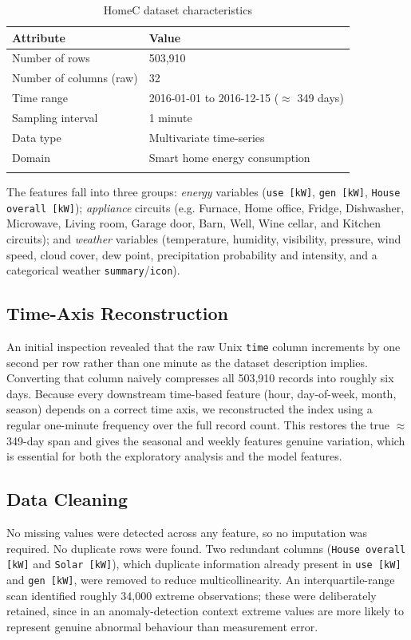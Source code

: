 \documentclass[pdflatex,sn-mathphys-num]{sn-jnl}%
\theoremstyle{thmstyleone}%
\theoremstyle{thmstyletwo}%
\theoremstyle{thmstylethree}%
\begin{document}
\begin{table}[h]
\caption{HomeC dataset characteristics}\label{tab:dataset}
\begin{tabular}{@{}ll@{}}
\toprule
Attribute & Value \\
\midrule
Number of rows & 503{,}910 \\
Number of columns (raw) & 32 \\
Time range & 2016-01-01 to 2016-12-15 ($\approx$ 349 days) \\
Sampling interval & 1 minute \\
Data type & Multivariate time-series \\
Domain & Smart home energy consumption \\
\botrule
\end{tabular}
\end{table}

The features fall into three groups: \emph{energy} variables (\texttt{use [kW]}, \texttt{gen [kW]}, \texttt{House overall [kW]}); \emph{appliance} circuits (e.g. Furnace, Home office, Fridge, Dishwasher, Microwave, Living room, Garage door, Barn, Well, Wine cellar, and Kitchen circuits); and \emph{weather} variables (temperature, humidity, visibility, pressure, wind speed, cloud cover, dew point, precipitation probability and intensity, and a categorical weather \texttt{summary}/\texttt{icon}).

\subsection{Time-Axis Reconstruction}
An initial inspection revealed that the raw Unix \texttt{time} column increments by one second per row rather than one minute as the dataset description implies. Converting that column naively compresses all 503{,}910 records into roughly six days. Because every downstream time-based feature (hour, day-of-week, month, season) depends on a correct time axis, we reconstructed the index using a regular one-minute frequency over the full record count. This restores the true $\approx$ 349-day span and gives the seasonal and weekly features genuine variation, which is essential for both the exploratory analysis and the model features.

\subsection{Data Cleaning}
No missing values were detected across any feature, so no imputation was required. No duplicate rows were found. Two redundant columns (\texttt{House overall [kW]} and \texttt{Solar [kW]}), which duplicate information already present in \texttt{use [kW]} and \texttt{gen [kW]}, were removed to reduce multicollinearity. An interquartile-range scan identified roughly 34{,}000 extreme observations; these were deliberately retained, since in an anomaly-detection context extreme values are more likely to represent genuine abnormal behaviour than measurement error.
\end{document}
